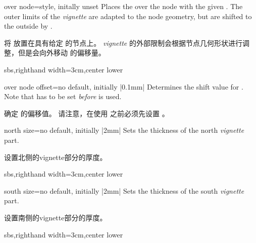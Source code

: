 \begin{vigTcbKey}[][doc new=2016-04-22]{over node}{=}{style, initally unset}
Places the  over the node with the given .
The outer limits of the \emph{vignette} are adapted to the node geometry, but
are shifted to the outside by .

将  放置在具有给定  的节点上。 \emph{vignette} 的外部限制会根据节点几何形状进行调整，但是会向外移动  的偏移量。
\begin{dispExample*}{sbs,righthand width=3cm,center lower}
\end{dispExample*}
\end{vigTcbKey}

\begin{vigTcbKey}[][doc new=2016-04-22]{over node offset}{=}{no default, initially |0.1mm|}
Determines the shift value for .
Note that  has to be set \emph{before}
 is used.

确定  的偏移值。 请注意，在使用  之前必须先设置 。
\end{vigTcbKey}


\begin{vigTcbKey}[][doc new=2016-04-22]{north size}{=}{no default, initially |2mm|}
Sets the thickness of the north \emph{vignette} part.

设置北侧的vignette部分的厚度。
\begin{dispExample*}{sbs,righthand width=3cm,center lower}
\end{dispExample*}
\end{vigTcbKey}

\begin{vigTcbKey}[][doc new=2016-04-22]{south size}{=}{no default, initially |2mm|}
Sets the thickness of the south \emph{vignette} part.

设置南侧的vignette部分的厚度。
\begin{dispExample*}{sbs,righthand width=3cm,center lower}
\end{dispExample*}
\end{vigTcbKey}

